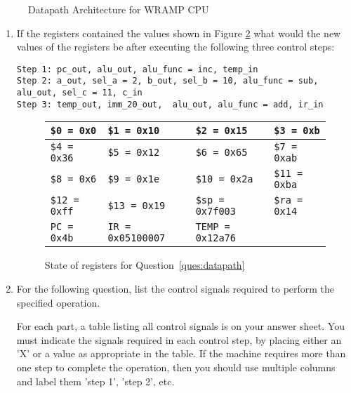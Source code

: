 \documentclass[a4paper,10pt]{article}
\begin{document}
\begin{enumerate}
\begin{figure}[h]
\begin{center}
    \caption{Datapath Architecture for WRAMP CPU}
    \label{fig:wrampblok}
  \end{center}
\end{figure}

\begin{enumerate}

  \item If the registers contained the values shown in Figure
  \ref{fig:wrampreg} what would the new values of the registers be
  after executing the following three control steps:
{\small
\begin{verbatim}
Step 1: pc_out, alu_out, alu_func = inc, temp_in
Step 2: a_out, sel_a = 2, b_out, sel_b = 10, alu_func = sub, alu_out, sel_c = 11, c_in
Step 3: temp_out, imm_20_out,  alu_out, alu_func = add, ir_in
\end{verbatim}
}

\begin{figure}[h]
\begin{center}
\begin{tabular}{|l|l|l|l|}
\hline
\verb+$0 = 0x0+ & \verb+$1 = 0x10+ & \verb+$2 = 0x15+ & \verb+$3 = 0xb+
\\
\hline
\verb+$4 = 0x36+ & \verb+$5 = 0x12+ & \verb+$6 = 0x65+ & \verb+$7 = 0xab+
\\
\hline
\verb+$8 = 0x6+ & \verb+$9 = 0x1e+ & \verb+$10 = 0x2a+ & \verb+$11 = 0xba+
\\
\hline
\verb+$12 = 0xff+ & \verb+$13 = 0x19+ & \verb+$sp = 0x7f003+ & \verb+$ra = 0x14+
\\
\hline
\verb+PC = 0x4b+ & \verb+IR = 0x05100007+ & \verb+TEMP = 0x12a76+ & \\
\hline
\end{tabular}
\end{center}
\caption{State of registers for Question~\ref{ques:datapath}}
\label{fig:wrampreg}
\end{figure}

\item For the following question, list the control signals required to perform the specified operation.

For each part, a table listing all control signals is on your answer sheet. You must indicate
the signals required in each control step, by placing either an 'X' or a value as appropriate
in the table. If the machine requires more than one step to complete the operation, then you should
use multiple columns and label them 'step 1', 'step 2', etc. 


\end{enumerate}
\end{enumerate}
\end{document}
